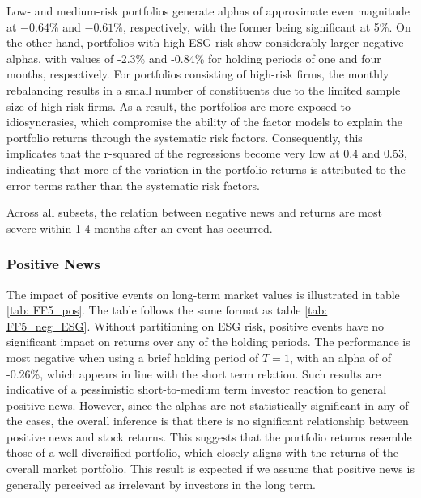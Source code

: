 Low- and medium-risk portfolios generate alphas of approximate even magnitude at $-0.64\%$ and $-0.61\%$, respectively, with the former being significant at 5\%. On the other hand, portfolios with high ESG risk show considerably larger negative alphas, with values of -2.3\% and -0.84\% for holding periods of one and four months, respectively. For portfolios consisting of high-risk firms, the monthly rebalancing results in a small number of constituents due to the limited sample size of high-risk firms. As a result, the portfolios are more exposed to idiosyncrasies, which compromise the ability of the factor models to explain the portfolio returns through the systematic risk factors. Consequently, this implicates that the r-squared of the regressions become very low at 0.4 and 0.53, indicating that more of the variation in the portfolio returns is attributed to the error terms rather than the systematic risk factors. 

Across all subsets, the relation between negative news and returns are most severe within 1-4 months after an event has occurred.

\subsubsection{Positive News}

The impact of positive events on long-term market values is illustrated in table \ref{tab: FF5_pos}. The table follows the same format as table \ref{tab: FF5_neg_ESG}. Without partitioning on ESG risk, positive events have no significant impact on returns over any of the holding periods. The performance is most negative when using a brief holding period of $T=1$, with an alpha of of -0.26\%, which appears in line with the short term relation. Such results are indicative of a pessimistic short-to-medium term investor reaction to general positive news. However, since the alphas are not statistically significant in any of the cases, the overall inference is that there is no significant relationship between positive news and stock returns. This suggests that the portfolio returns resemble those of a well-diversified portfolio, which closely aligns with the returns of the overall market portfolio. This result is expected if we assume that positive news is generally perceived as irrelevant by investors in the long term.

